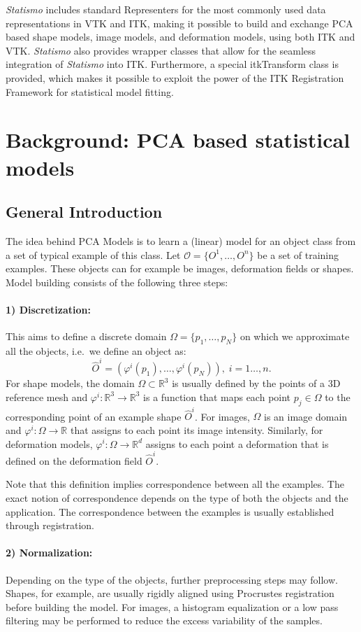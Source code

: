 \documentclass{InsightArticle}
\newcommand{\Statismo}{\emph{Statismo}\xspace}
\def\R{\mathds{R}} %
\begin{document}
\Statismo includes standard Representers for the most commonly used
data representations in VTK and ITK, making it possible to build and
exchange PCA based shape models, image models, and deformation models,
using both ITK and VTK. \Statismo also provides wrapper classes that
allow for the seamless integration of \Statismo into ITK. Furthermore,
a special itkTransform class is provided, which makes it possible 
to exploit the power of the  ITK Registration Framework for
statistical model fitting.


\section{Background: PCA based statistical models}
\subsection{General Introduction}\label{sec:pca-models}
The idea behind PCA Models is to learn a (linear) model for an object class from a set of
typical example of this class. Let $\mathcal{O} = \{O^1, \ldots,
O^n\}$ be a set of training examples. These
objects can for example be images, deformation fields or shapes. Model
building consists of the following three steps:
\paragraph{1) Discretization:} This aims to define a discrete
domain $\Omega = \{p_1, \ldots, p_N\}$ on which we approximate all the objects, i.e.\ we define an object as:
\[
\hat{O}^i = (\varphi^i(p_1), \ldots, \varphi^i(p_N)), \; i  = 1 \dots, n. 
\]
For shape models, the domain $\Omega \subset \R^3$ is usually defined
by the points of a 3D reference mesh and $\varphi^i : \R^3 \to \R^3$
is a function that maps each point $p_j \in \Omega$ to the corresponding point of
an example shape $\hat{O}^i$. For images, $\Omega$ is an image domain
and $\varphi^i : \Omega \to \R$ that assigns to each point its image
intensity. Similarly, for deformation models, $\varphi^i : \Omega \to
\R^d$ assigns to each point a deformation that is defined on the
deformation field $\hat{O}^i$.

Note that this definition implies correspondence between all the examples. The
exact notion of correspondence depends on the type of both the objects and the
application. The correspondence between the examples is usually established through registration.
\paragraph{2) Normalization:}
Depending on the type of the objects, further preprocessing steps may
follow. Shapes, for example, are usually rigidly aligned using
Procrustes registration before building the model. For images, a
histogram equalization or a low pass filtering may be performed to
reduce the excess variability of the samples.
\end{document}
